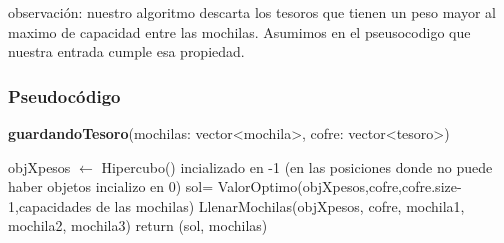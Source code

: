 \documentclass[spanish,12pt]{article}
\begin{document}
observación: nuestro algoritmo descarta los tesoros que tienen un peso mayor al maximo de capacidad entre las mochilas. Asumimos en el pseusocodigo que nuestra entrada cumple esa propiedad.


\subsubsection{Pseudocódigo}

\begin{algorithm}[H]{\textbf{guardandoTesoro}(mochilas: vector<mochila>, cofre: vector<tesoro>)}
	\begin{algorithmic}[1]
		\State objXpesos $\gets$ Hipercubo() incializado en -1 \Comment (en las posiciones donde no puede haber objetos incializo en 0)
		\State sol= ValorOptimo(objXpesos,cofre,cofre.size-1,capacidades de las mochilas)
		\State LlenarMochilas(objXpesos, cofre, mochila1, mochila2, mochila3)
		\State return (sol, mochilas)
	\end{algorithmic}
\end{algorithm}


\end{document}
